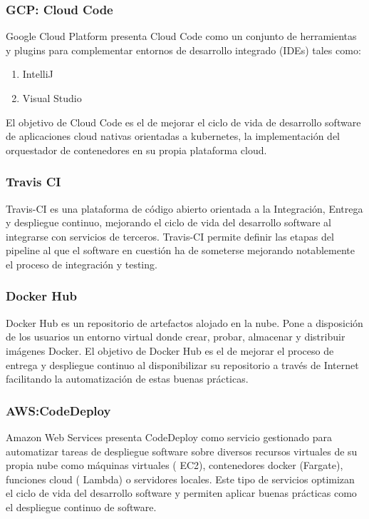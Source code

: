 \documentclass[a4paper,11pt]{book}
\begin{document}
\subsubsection{GCP: Cloud Code}

Google Cloud Platform\cite{gcp} presenta Cloud Code\cite{gcpcode} como un conjunto de herramientas y plugins para complementar entornos de desarrollo integrado (IDEs)  tales como: 

\begin{enumerate}
\item IntelliJ 
\item Visual Studio
\end{enumerate}

El objetivo de Cloud Code es el de mejorar el ciclo de vida de desarrollo software de aplicaciones cloud  nativas orientadas a kubernetes,  la implementación del orquestador de contenedores en su propia plataforma cloud. 

\subsubsection{Travis CI}

Travis-CI\cite{travis} es una plataforma de código abierto orientada a la Integración, Entrega y despliegue continuo, mejorando el ciclo de vida del desarrollo software al integrarse con servicios de terceros. Travis-CI permite definir las etapas del pipeline al que el software en cuestión ha de someterse mejorando notablemente el proceso de integración y testing. 

\subsubsection{Docker Hub}

Docker Hub\cite{dhub} es un repositorio de artefactos alojado en la nube. Pone a disposición de los usuarios un entorno virtual donde crear, probar, almacenar y distribuir imágenes Docker. El objetivo de Docker Hub es el de mejorar el proceso de entrega y despliegue continuo al disponibilizar su repositorio a través de Internet facilitando la automatización de estas buenas prácticas. 

\subsubsection{AWS:CodeDeploy}

Amazon Web Services\cite{aws} presenta  CodeDeploy\cite{awscode} como servicio gestionado para automatizar tareas de despliegue software sobre diversos recursos virtuales de su propia nube como máquinas virtuales ( EC2), contenedores docker (Fargate), funciones cloud ( Lambda) o servidores locales. Este tipo de servicios optimizan el ciclo de vida del desarrollo software y permiten aplicar buenas prácticas como el despliegue continuo de software. 
\end{document}
